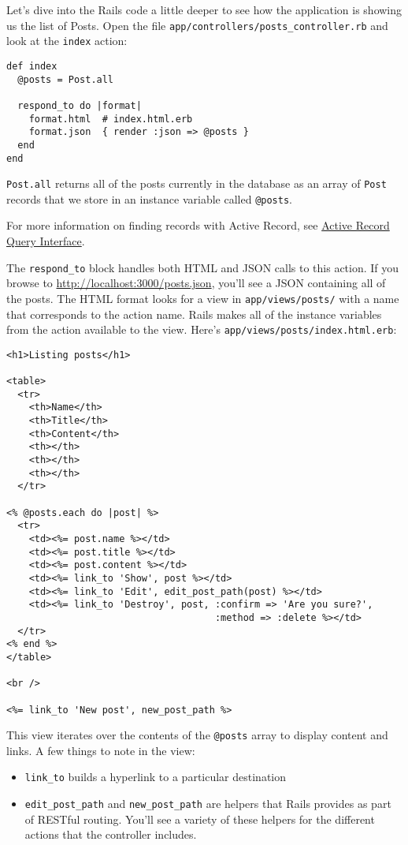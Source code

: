 \documentclass[10pt]{book}
\begin{document}
Let’s dive into the Rails code a little deeper to see how the application is showing us the list of Posts. Open the file \texttt{app/controllers/posts\_controller.rb} and look at the \texttt{index} action:
\begin{verbatim}
def index
  @posts = Post.all
 
  respond_to do |format|
    format.html  # index.html.erb
    format.json  { render :json => @posts }
  end
end
\end{verbatim}

\texttt{Post.all} returns all of the posts currently in the database as an array of \texttt{Post} records that we store in an instance variable called \texttt{@posts}.

For more information on finding records with Active Record, see \href{http://guides.rubyonrails.org/active_record_querying.html}{Active Record Query Interface}.

The \texttt{respond\_to} block handles both HTML and JSON calls to this action. If you browse to \href{http://localhost:3000/posts.json}{http://localhost:3000/posts.json}, you’ll see a JSON containing all of the posts. The HTML format looks for a view in \texttt{app/views/posts/} with a name that corresponds to the action name. Rails makes all of the instance variables from the action available to the view. Here’s \texttt{app/views/posts/index.html.erb}:


\begin{verbatim}
<h1>Listing posts</h1>
 
<table>
  <tr>
    <th>Name</th>
    <th>Title</th>
    <th>Content</th>
    <th></th>
    <th></th>
    <th></th>
  </tr>
 
<% @posts.each do |post| %>
  <tr>
    <td><%= post.name %></td>
    <td><%= post.title %></td>
    <td><%= post.content %></td>
    <td><%= link_to 'Show', post %></td>
    <td><%= link_to 'Edit', edit_post_path(post) %></td>
    <td><%= link_to 'Destroy', post, :confirm => 'Are you sure?',
                                     :method => :delete %></td>
  </tr>
<% end %>
</table>
 
<br />
 
<%= link_to 'New post', new_post_path %>
\end{verbatim}

This view iterates over the contents of the \texttt{@posts} array to display content and links. A few things to note in the view:
\begin{itemize}
	\item \texttt{link\_to} builds a hyperlink to a particular destination
	\item \texttt{edit\_post\_path} and \texttt{new\_post\_path} are helpers that  Rails provides as part of RESTful routing. You’ll see a variety of  these helpers for the different actions that the controller includes.
\end{itemize}
\end{document}
